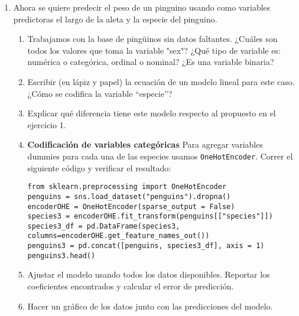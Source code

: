 \documentclass[a4paper,11pt]{article}
\theoremstyle{definition}
\begin{document}
\begin{enumerate}
\item Ahora se quiere predecir el peso de un pinguino usando como variables predictoras el largo de la aleta y la especie del pinguino.
\begin{enumerate}
\item Trabajamos con la base de ping\"uinos sin datos faltantes. ¿Cu\'ales son todos los valores que toma la variable "sex"? ¿Qu\'e tipo de variable es: numérica o categórica, ordinal o nominal? ¿Es una variable binaria?
\item Escribir (en lápiz y papel) la ecuación de un modelo lineal para este caso. ¿Cómo se codifica la variable “especie”?
\item Explicar qué diferencia tiene este modelo respecto al propuesto en el ejercicio 1.
\item \textbf{Codificación de variables categóricas} Para agregar variables dummies para cada una de las especies usamos \lstinline{OneHotEncoder}. Correr el siguiente c\'odigo y verificar el resultado:
\begin{lstlisting}
from sklearn.preprocessing import OneHotEncoder
penguins = sns.load_dataset("penguins").dropna()
encoderOHE = OneHotEncoder(sparse_output = False)
species3 = encoderOHE.fit_transform(penguins[["species"]])
species3_df = pd.DataFrame(species3, columns=encoderOHE.get_feature_names_out())
penguins3 = pd.concat([penguins, species3_df], axis = 1)
penguins3.head()
\end{lstlisting}

\item Ajustar el modelo usando todos los datos disponibles. Reportar los coeficientes encontrados y calcular el error de predicción.
\item Hacer un gráfico de los datos junto con las predicciones del modelo.
\end{enumerate}

\end{enumerate}
\end{document}
